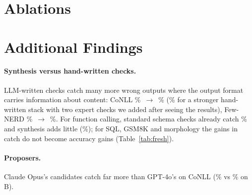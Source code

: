 \documentclass[11pt]{article}
\begin{document}
\section{Ablations}\label{app:ablate}
\begin{table}[h]\centering\footnotesize
\setlength{\tabcolsep}{2.4pt}
\caption{Ablations (\%), computed on the candidate pool before the last
CoNLL proposer round (hence CoNLL catch 52.0 here vs 52.5 in
Table~\ref{tab:safety}). Claimed: the bound each procedure would report,
at the level of the main certificate. The single-split bound held on our
data; its risk is selection bias that a held-out split removes by
construction.
Holds: test $\bar\delta\le$ Claimed, an empirical comparison (test
$\bar\delta$ is not formally bounded by $\gamma$). Acc.: gated best-of-32 on
the development test draws.}
\label{tab:ablate}
\end{table}

\section{Additional Findings}\label{app:more}
\paragraph{Synthesis versus hand-written checks.} LLM-written checks catch
many more wrong outputs where the output format carries information about
content: CoNLL \catchHwIE\%~$\to$~\catchCertIE\% (\catchStrongIE\% for a
stronger hand-written stack with two expert checks we added after seeing
the results), Few-NERD \catchHwFewnerd\%~$\to$~\catchCertFewnerd\%.
For function calling, standard schema checks already catch \catchHwFC\% and
synthesis adds little (\catchCertFC\%); for SQL, GSM8K and morphology the
gains in catch do not become accuracy gains (Table~\ref{tab:fresh}).

\paragraph{Proposers.} Claude Opus's candidates catch far more than
GPT-4o's on CoNLL (\ablOpusCatchIE\% vs \ablGptCatchIE\% on B).
\end{document}
